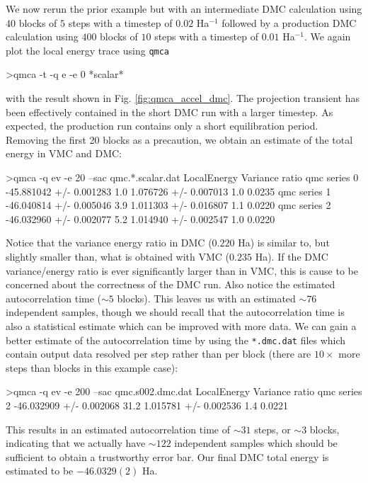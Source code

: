 We now rerun the prior example but with an intermediate DMC 
calculation using $40$ blocks of $5$ steps with a timestep of 
$0.02$ Ha$^{-1}$ followed by a production DMC calculation 
using $400$ blocks of $10$ steps with a timestep of $0.01$ Ha$^{-1}$.
We again plot the local energy trace using \texttt{qmca}
\begin{shade}
>qmca -t -q e -e 0 *scalar*
\end{shade}
\noindent
with the result shown in Fig. \ref{fig:qmca_accel_dmc}.
The projection transient has been effectively contained in the 
short DMC run with a larger timestep.  As expected, the 
production run contains only a short equilibration period.
Removing the first 20 blocks as a precaution, we obtain an estimate 
of the total energy in VMC and DMC:
\begin{shade}
>qmca -q ev -e 20 --sac qmc.*.scalar.dat 
                            LocalEnergy               Variance           ratio 
qmc  series 0  -45.881042 +/- 0.001283    1.0   1.076726 +/- 0.007013    1.0   0.0235 
qmc  series 1  -46.040814 +/- 0.005046    3.9   1.011303 +/- 0.016807    1.1   0.0220 
qmc  series 2  -46.032960 +/- 0.002077    5.2   1.014940 +/- 0.002547    1.0   0.0220 
\end{shade}
\noindent
Notice that the variance energy ratio in DMC ($0.220$ Ha) is similar to, but 
slightly smaller than, what is obtained with VMC ($0.235$ Ha).  If the DMC 
variance/energy ratio is ever significantly larger than in VMC, this is 
cause to be concerned about the correctness of the DMC run.  Also notice 
the estimated autocorrelation time ($\sim 5$ blocks).  This leaves us with 
an estimated $\sim 76$ independent samples, though we should recall that 
the autocorrelation time is also a statistical estimate which can be improved 
with more data.  We can gain a better estimate of the autocorrelation 
time by using the \texttt{*.dmc.dat} files which contain output data resolved 
per step rather than per block (there are $10\times$ more steps than blocks 
in this example case):
\begin{shade}
>qmca -q ev -e 200 --sac qmc.s002.dmc.dat 
                            LocalEnergy               Variance           ratio 
qmc  series 2  -46.032909 +/- 0.002068   31.2   1.015781 +/- 0.002536    1.4   0.0221 
\end{shade}
\noindent
This results in an estimated autocorrelation time of $\sim 31$ steps, or 
$\sim 3$ blocks, indicating that we actually have $\sim 122$ independent 
samples which should be sufficient to obtain a trustworthy error bar.
Our final DMC total energy is estimated to be $-46.0329(2)$ Ha.

